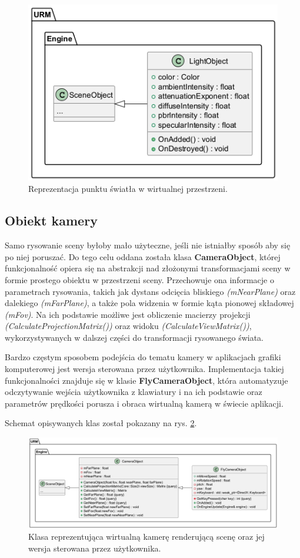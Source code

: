 	\begin{figure}[h!]
		\centering
		\includegraphics[width=\textwidth]{images/UML/sceneobjects_light.png}
		\caption{Reprezentacja punktu światła w wirtualnej przestrzeni.}
		\label{UML_SceneObjects_Light}
	\end{figure}
	
\subsection{Obiekt kamery}
	Samo rysowanie sceny byłoby mało użyteczne, jeśli nie istniałby sposób aby się po niej poruszać. Do tego celu oddana została klasa \textbf{CameraObject}, której funkcjonalność opiera się na abstrakcji nad złożonymi transformacjami sceny w formie prostego obiektu w przestrzeni sceny. Przechowuje ona informacje o parametrach rysowania, takich jak dystans odcięcia bliskiego \textit{(mNearPlane)} oraz dalekiego \textit{(mFarPlane)}, a także pola widzenia w formie kąta pionowej składowej \textit{(mFov)}. Na ich podstawie możliwe jest obliczenie macierzy projekcji \textit{(CalculateProjectionMatrix())} oraz widoku \textit{(CalculateViewMatrix())}, wykorzystywanych w dalszej części do transformacji rysowanego świata.
	
	Bardzo częstym sposobem podejścia do tematu kamery w aplikacjach grafiki komputerowej jest wersja sterowana przez użytkownika. Implementacja takiej funkcjonalności znajduje się w klasie \textbf{FlyCameraObject}, która automatyzuje odczytywanie wejścia użytkownika z klawiatury i na ich podstawie oraz parametrów prędkości porusza i obraca wirtualną kamerą w świecie aplikacji.
	
	Schemat opisywanych klas został pokazany na rys. \ref{UML_SceneObjects_Camera}.
	
	\begin{figure}[h!]
		\centering
		\includegraphics[width=\textwidth]{images/UML/sceneobjects_camera.png}
		\caption{Klasa reprezentująca wirtualną kamerę renderującą scenę oraz jej wersja sterowana przez użytkownika.}
		\label{UML_SceneObjects_Camera}
	\end{figure}
	
	\vfill
	\clearpage